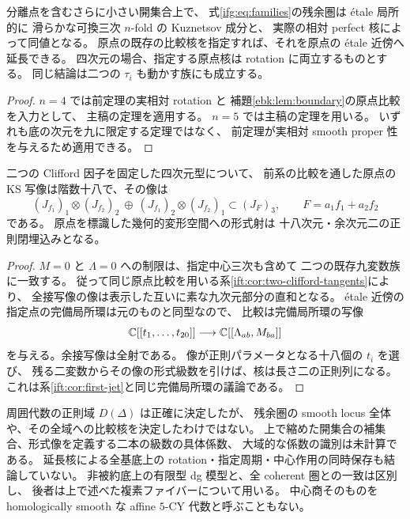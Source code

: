 \begin{corollary}[十八変数族の局所可換比較]
\label{ifg:cor:local-comparison}
分離点を含むさらに小さい開集合上で、
式\eqref{ifg:eq:families}の残余圏は \'etale 局所的に
滑らかな可換三次 $n$-fold の Kuznetsov 成分と、
実際の相対 perfect 核によって同値となる。
原点の既存の比較核を指定すれば、それを原点の \'etale 近傍へ延長できる。
四次元の場合、指定する原点核は rotation に両立するものとする。
同じ結論は二つの $\tau_i$ も動かす族にも成立する。
\end{corollary}

\begin{proof}
$n=4$ では前定理の実相対 rotation と
補題\ref{ebk:lem:boundary}の原点比較を入力として、
主稿の定理を適用する。
$n=5$ では主稿の定理を用いる。
いずれも底の次元を九に限定する定理ではなく、
前定理が実相対 smooth proper 性を与えるため適用できる。
\end{proof}

\begin{corollary}[十八方向の積分と余次元二の形式像]
\label{ifg:cor:rank-eighteen}
二つの Clifford 因子を固定した四次元型について、
前系の比較を通した原点の KS 写像は階数十八で、その像は
\[
  (J_{f_1})_1\otimes(J_{f_2})_2
       \ \oplus\ (J_{f_1})_2\otimes(J_{f_2})_1
      \subset (J_F)_3,\qquad F=a_1f_1+a_2f_2
\]
である。
原点を標識した幾何的変形空間への形式射は
十八次元・余次元二の正則閉埋込みとなる。
\end{corollary}

\begin{proof}
$M=0$ と $\Lambda=0$ への制限は、指定中心三次も含めて
二つの既存九変数族に一致する。
従って同じ原点比較を用いる系\ref{ift:cor:two-clifford-tangents}により、
全接写像の像は表示した互いに素な九次元部分の直和となる。
\'etale 近傍の指定点の完備局所環は元のものと同型なので、
比較は完備局所環の写像
\[
 \mathbb C[[t_1,\ldots,t_{20}]]
          \longrightarrow\mathbb C[[\Lambda_{ab},M_{ba}]]
\]
を与える。余接写像は全射である。
像が正則パラメータとなる十八個の $t_i$ を選び、
残る二変数からその像の形式級数を引けば、核は長さ二の正則列になる。
これは系\ref{ift:cor:first-jet}と同じ完備局所環の議論である。
\end{proof}

\begin{remark}[比較域と標識の範囲]
\label{ifg:rem:scope}
周囲代数の正則域 $D(\Delta)$ は正確に決定したが、
残余圏の smooth locus 全体や、その全域への比較核を決定したわけではない。
上で縮めた開集合の補集合、形式像を定義する二本の級数の具体係数、
大域的な係数の識別は未計算である。
延長核による全基底上の rotation・指定周期・中心作用の同時保存も結論していない。
非被約底上の有限型 dg 模型と、全 coherent 圏との一致は区別し、
後者は上で述べた複素ファイバーについて用いる。
中心商そのものを homologically smooth な affine $5$-CY 代数と呼ぶこともない。
\end{remark}

